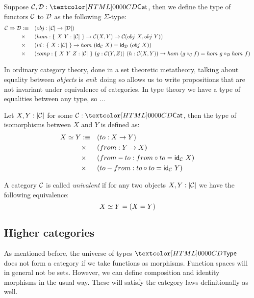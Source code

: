 \begin{definition}[Functor]
  Suppose $\Cc, \Dd : \Cat$, then we define the type of functors $\mathcal{C}$
  to $\mathcal{D}$ as the following $\Sigma$-type:
  \begin{align*}
    \Func{\Cc}{\Dd} &\ddefeq &&(obj : | \Cc | \to | \Dd |) \\
    &\times &&(hom : \{\ X\ Y : | \Cc |\ \} \to \Cc(X,Y) \to \Cc(obj\ X, obj\ Y)) \\
    &\times &&(id : \{\ X : | \Cc |\ \} \to hom\ (\id_{\Cc}\ X) = \id_{\Dd}\ (obj\ X)) \\
    &\times &&(comp : \{\ X\ Y\ Z : | \Cc |\ \}\ (g : \Cc(Y,Z))\ (h : \Cc(X,Y)) \to hom\ (g \circ_{\Cc} f) = hom\ g \circ_{\Dd} hom\ f)
  \end{align*}
\end{definition}

In ordinary category theory, done in a set theoretic metatheory,
talking about equality between \emph{objects} is \emph{evil}: doing so
allows us to write propositions that are not invariant under
equivalence of categories. In type theory we have a type of equalities
between any type, so ...

\begin{definition}[Isomorphism]
  Let $X, Y : | \mathcal{C} |$ for some $\Cc : \Cat$, then the type of
  isomorphisms between $X$ and $Y$ is defined as:
  \begin{align*}
    \Iso{X}{Y} &\ddefeq &&(to : X \to Y) \\
               &\times &&(from : Y \to X) \\
               &\times &&(from-to : from \circ to = \id_{\Cc}\ X) \\
               &\times &&(to-from : to \circ to = \id_{\Cc}\ Y)
  \end{align*}
\end{definition}

\begin{definition}
  A category $\mathcal{C}$ is called \emph{univalent} if for any two objects
  $X, Y : | \mathcal{C} |$ we have the following equivalence:
  $$
  X \simeq Y = (X = Y)
  $$  
\end{definition}

\subsection{Higher categories}

As mentioned before, the universe of types $\Type$ does not form a
category if we take functions as morphisms. Function spaces will in
general not be sets. However, we can define composition and identity
morphisms in the usual way. These will satisfy the category laws
definitionally as well.


